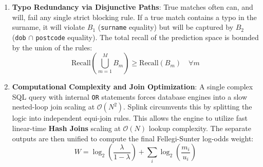 \begin{enumerate}
	\item \textbf{Typo Redundancy via Disjunctive Paths}: True matches often can, and will, fail any single strict blocking rule. If a true match contains a typo in the surname, it will violate $B_1$ (\texttt{surname} equality) but will be captured by $B_2$ (\texttt{dob} $\cap$ \texttt{postcode} equality). The total recall of the prediction space is bounded by the union of the rules:
		      \begin{equation}
			      \text{Recall}\left(\bigcup_{m=1}^{M} B_m\right) \ge \text{Recall}(B_m) \quad \forall m
		      \end{equation}
	\item \textbf{Computational Complexity and Join Optimization}: A single complex SQL query with internal \texttt{OR} statements forces database engines into a slow nested-loop join scaling at $\mathcal{O}(N^2)$. Splink circumvents this by splitting the logic into independent equi-join rules. This allows the engine to utilize fast linear-time \textbf{Hash Joins} scaling at $\mathcal{O}(N)$ lookup complexity. The separate outputs are then unified to compute the final Fellegi-Sunter log-odds weight:
		      \begin{equation}
				      W = \log_2\left(\frac{\lambda}{1-\lambda}\right) + \sum_i \log_2 \left( \frac{m_i}{u_i} \right)
		      \end{equation}
\end{enumerate}



